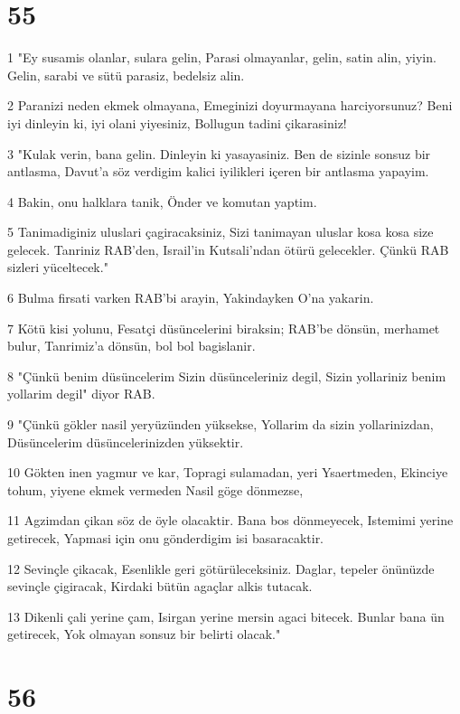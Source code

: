 \chapter{55}

\par 1 "Ey susamis olanlar, sulara gelin, Parasi olmayanlar, gelin, satin alin, yiyin. Gelin, sarabi ve sütü parasiz, bedelsiz alin.
\par 2 Paranizi neden ekmek olmayana, Emeginizi doyurmayana harciyorsunuz? Beni iyi dinleyin ki, iyi olani yiyesiniz, Bollugun tadini çikarasiniz!
\par 3 "Kulak verin, bana gelin. Dinleyin ki yasayasiniz. Ben de sizinle sonsuz bir antlasma, Davut'a söz verdigim kalici iyilikleri içeren bir antlasma yapayim.
\par 4 Bakin, onu halklara tanik, Önder ve komutan yaptim.
\par 5 Tanimadiginiz uluslari çagiracaksiniz, Sizi tanimayan uluslar kosa kosa size gelecek. Tanriniz RAB'den, Israil'in Kutsali'ndan ötürü gelecekler. Çünkü RAB sizleri yüceltecek."
\par 6 Bulma firsati varken RAB'bi arayin, Yakindayken O'na yakarin.
\par 7 Kötü kisi yolunu, Fesatçi düsüncelerini biraksin; RAB'be dönsün, merhamet bulur, Tanrimiz'a dönsün, bol bol bagislanir.
\par 8 "Çünkü benim düsüncelerim Sizin düsünceleriniz degil, Sizin yollariniz benim yollarim degil" diyor RAB.
\par 9 "Çünkü gökler nasil yeryüzünden yüksekse, Yollarim da sizin yollarinizdan, Düsüncelerim düsüncelerinizden yüksektir.
\par 10 Gökten inen yagmur ve kar, Topragi sulamadan, yeri Ysaertmeden, Ekinciye tohum, yiyene ekmek vermeden Nasil göge dönmezse,
\par 11 Agzimdan çikan söz de öyle olacaktir. Bana bos dönmeyecek, Istemimi yerine getirecek, Yapmasi için onu gönderdigim isi basaracaktir.
\par 12 Sevinçle çikacak, Esenlikle geri götürüleceksiniz. Daglar, tepeler önünüzde sevinçle çigiracak, Kirdaki bütün agaçlar alkis tutacak.
\par 13 Dikenli çali yerine çam, Isirgan yerine mersin agaci bitecek. Bunlar bana ün getirecek, Yok olmayan sonsuz bir belirti olacak."

\chapter{56}

